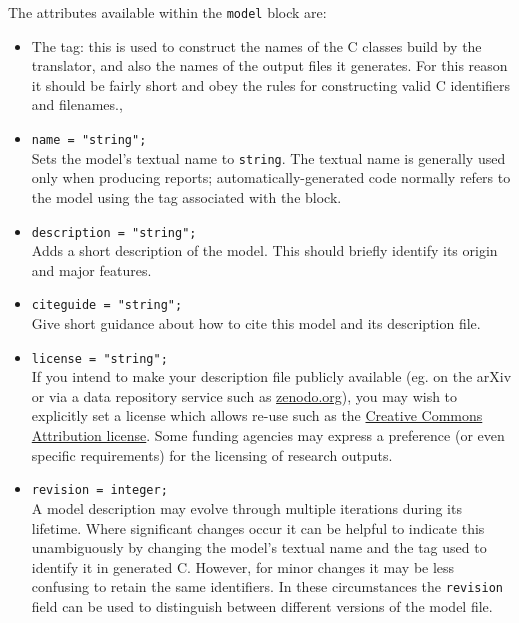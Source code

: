\documentclass[11pt,a4paper]{article}
\newcommand{\block}[1]{\texttt{#1}}
\newcommand{\attribute}[1]{\texttt{#1}}
\newcommand\CC{C\nolinebreak\hspace{-.05em}\raisebox{.4ex}{\relsize{-3}{\textbf{+}}}\nolinebreak\hspace{-.10em}\raisebox{.4ex}{\relsize{-3}{\textbf{+}}}}
\begin{document}
The attributes available within the \block{model} block are:
\begin{itemize}
	\item The tag: this is used to construct the names of the
	{\CC} classes build by the translator,
	and also the names of the output files it generates.
	For this reason it should be fairly short and obey the
	rules for constructing valid {\CC} identifiers and
	filenames.,

    \item \attribute{name = "string";} \\
    Sets the model's textual name to \attribute{string}. The textual name
    is generally used only when producing reports;
    automatically-generated code normally refers to the model
    using the tag associated with the block.
    
    \item \attribute{description = "string";} \\
    Adds a short description of the model. This should briefly identify
    its origin and major features.
    
    \item \attribute{citeguide = "string";} \\
    Give short guidance about how to cite this model and its description file.
    
    \item \attribute{license = "string";} \\
    If you intend to make your description file publicly available (eg. on the
    arXiv or via a data repository service such as
    \href{http://www.zenodo.org}{zenodo.org}),
    you may wish to explicitly set a license which allows re-use
    such as the
    \href{https://creativecommons.org/licenses/}{Creative Commons Attribution license}.
    Some funding agencies may express a preference
    (or even specific requirements) for the licensing of research outputs.
    
    \item \attribute{revision = integer;} \\
    A model description may evolve through multiple iterations during its
    lifetime.
    Where significant changes occur it can be helpful to indicate this
    unambiguously by changing the model's textual name and the tag
    used to identify it in generated {\CC}.
    However, for minor changes it may be less confusing to retain
    the same identifiers. In these circumstances the
    \attribute{revision} field can be used to
    distinguish between different versions
    of the model file.
    

\end{itemize}
\end{document}
